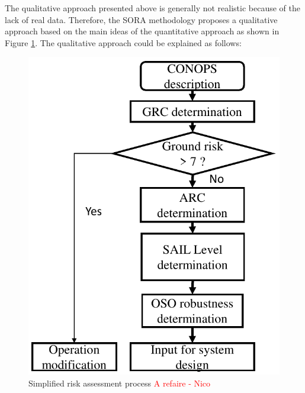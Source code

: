 \documentclass[a4paper, 10, conference]{ieeeconf}  %
\begin{document}
The qualitative approach presented above is generally not realistic because of the lack of real data. Therefore, the SORA methodology proposes a qualitative approach based on the main ideas of the quantitative approach as shown in Figure \ref{figure: Simplified SORA process}. The qualitative approach could be explained as follows:
	 \begin{figure}[!ht]
		\centering
		\includegraphics[width= 2.9 in]{image/original_workflow.pdf}
		\caption{Simplified risk assessment process \textcolor{red}{A refaire - Nico}}
		\label{figure: Simplified SORA process}
	\end{figure}  
\end{document}
